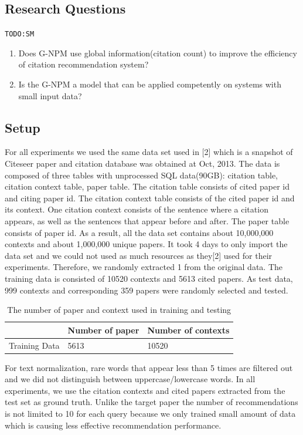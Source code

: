 \documentclass{llncs}
\newcommand{\todo}[1]{\texttt{\color{red}TODO:#1}}
\begin{document}
\subsection{Research Questions}
\todo{SM}

\begin{enumerate}
\item Does G-NPM use global information(citation count) to improve the efficiency of citation recommendation system?
\item Is the G-NPM a model that can be applied competently on systems with small input data?
\end{enumerate}
\subsection{Setup}
\label{sec:setup}
For all experiments we used the same data set used in [2] which is a snapshot of Citeseer paper and citation database was obtained at Oct, 2013. The data is composed of three tables with unprocessed SQL data(90GB): citation table, citation context table, paper table. The citation table consists of cited paper id and citing paper id. The citation context table consists of the cited paper id and its context. One citation context consists of the sentence where a citation appears, as well as the sentences that appear before and after. The paper table consists of paper id. As a result, all the data set contains about 10,000,000 contexts and about 1,000,000 unique papers.
It took 4 days to only import the data set and we could not used as much resources as they[2] used for their experiments. Therefore, we randomly extracted 1 from the original data. The training data is consisted of 10520 contexts and 5613 cited papers. As test data, 999 contexts and corresponding 359 papers were randomly selected and tested.

\begin{table}[ht]
\centering
\begin{tabular}{l || p{} | p{}}
\toprule
& Number of paper & Number of contexts \\
\midrule
Training Data & 5613 & 10520 \\
\bottomrule
\end{tabular}
\caption{The number of paper and context used in training and testing}\label{table:data}
\vspace{-2em}
\end{table}

For text normalization, rare words that appear less than 5 times are filtered out and we did not distinguish between uppercase/lowercase words. In all experiments, we use the citation contexts and cited papers extracted from the test set as ground truth. Unlike the target paper the number of recommendations is not limited to 10 for each query because we only trained small amount of data which is causing less effective recommendation performance.
\end{document}
